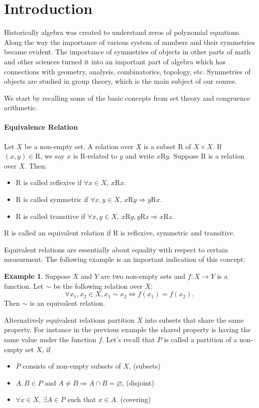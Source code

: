 \documentclass{article}
\theoremstyle{plain}
\theoremstyle{definition}
\newtheorem*{example}{Example}
\newcommand{\R}{\mathrm{R}}
\begin{document}
\section{Introduction}


Historically algebra was created to understand zeros of
polynomial equations. Along the way the importance of various
system of numbers and their symmetries became evident.
The importance of symmetries of objects in other parts of
math and other sciences turned it into an important part of
algebra which has connections with geometry, analysis,
combinatorics, topology, etc. Symmetries of objects are studied
in group theory, which is the main subject of our course.

We start by recalling some of the basic concepts from
set theory and congruence arithmetic.

\paragraph{Equivalence Relation}
Let $X$ be a non-empty set. A relation over $X$ is a subset
$\R$ of $X\times X$. If $(x,y)\in\R$, we say $x$ is $\R$-related
to $y$ and write $x\R y$. Suppose $\R$ is a relation over $X$.
Then:
\begin{itemize}
    \item $\R$ is called reflexive if $\forall x\in X$, $x\R x$.
    \item $\R$ is called symmetric if $\forall x,y\in X$, $x\R y\Rightarrow y\R x$.
    \item $\R$ is called transitive if $\forall x,y\in X$, $x\R y,y\R z\Rightarrow x\R z$.
\end{itemize}

$\R$ is called an equivalent relation if $\R$ is reflexive, symmetric
and transitive.

Equivalent relations are essentially about equality with
respect to certain measurment. The following example
is an important indication of this concept:

\begin{example}
    Suppose $X$ and $Y$ are two non-empty sets and $f:X\to Y$
    is a function. Let $\sim$ be the following relation over $X$:
    \[\forall x_1,x_2\in X,x_1\sim x_2\Longleftrightarrow f(x_1)=f(x_2).\]
    Then $\sim$ is an equivalent relation.
\end{example}

Alternatively equivalent relations partition $X$ into subsets
that share the same property. For instance in the previous example
the shared property is having the same value under the function $f$.
Let's recall that $P$ is called a partition of a non-empty set
$X$, if 
\begin{itemize}
    \item $P$ consists of non-empty subsets of $X$, (subsets)
    \item $A,B\in P$ and $A\neq B\Rightarrow A\cap B=\varnothing$, (disjoint)
    \item $\forall x\in X$, $\exists A\in P$ such that $x\in A$. (covering)
\end{itemize}
\end{document}
